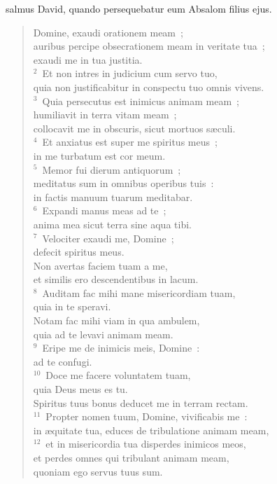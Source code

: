 \bchapter
{}salmus David, quando persequebatur eum Absalom filius ejus. \begin{flushleft}\begin{verse}\vspace{6pt}Domine, exaudi orationem meam~;\\ auribus percipe obsecrationem meam in veritate tua~;\\ exaudi me in tua justitia.\\
${}^{2}$~Et non intres in judicium cum servo tuo,\\ quia non justificabitur in conspectu tuo omnis vivens.\\
${}^{3}$~Quia persecutus est inimicus animam meam~;\\ humiliavit in terra vitam meam~;\\ collocavit me in obscuris, sicut mortuos s\ae culi.\\
${}^{4}$~Et anxiatus est super me spiritus meus~;\\ in me turbatum est cor meum.\\
${}^{5}$~Memor fui dierum antiquorum~;\\ meditatus sum in omnibus operibus tuis~:\\ in factis manuum tuarum meditabar.\\
${}^{6}$~Expandi manus meas ad te~;\\ anima mea sicut terra sine aqua tibi.\\
${}^{7}$~Velociter exaudi me, Domine~;\\ defecit spiritus meus.\\ Non avertas faciem tuam a me,\\ et similis ero descendentibus in lacum.\\
${}^{8}$~Auditam fac mihi mane misericordiam tuam,\\ quia in te speravi.\\ Notam fac mihi viam in qua ambulem,\\ quia ad te levavi animam meam.\\
${}^{9}$~Eripe me de inimicis meis, Domine~:\\ ad te confugi.\\
${}^{10}$~Doce me facere voluntatem tuam,\\ quia Deus meus es tu.\\ Spiritus tuus bonus deducet me in terram rectam.\\
${}^{11}$~Propter nomen tuum, Domine, vivificabis me~:\\ in \ae quitate tua, educes de tribulatione animam meam,\\
${}^{12}$~et in misericordia tua disperdes inimicos meos,\\ et perdes omnes qui tribulant animam meam,\\ quoniam ego servus tuus sum.\end{verse}\end{flushleft}



